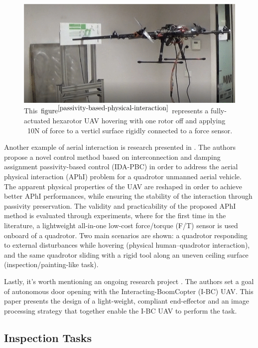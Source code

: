 \begin{figure}[H]
	\includegraphics[width=0.95\columnwidth]{figure/passivity-based-interaction.png}	
	\centering
	\caption{This $\text{figure}^{\cite{passivity-based-physical-interaction}}$ represents a fully-actuated hexarotor UAV hovering with one rotor off and applying ~10N of force to a verticl surface rigidly connected to a force sensor.}
	\label{fig:aerial_compliance}
\end{figure}

Another example of aerial interaction is research presented in \cite{passivity-based-aerial-interaction}. The authors propose a novel control method based on interconnection and damping assignment passivity-based control (IDA-PBC) in order to address the aerial physical interaction (APhI) problem for a quadrotor unmanned aerial vehicle. The apparent physical properties of the UAV are reshaped in order to achieve better APhI performances, while ensuring the stability of the interaction through passivity preservation. The validity and practicability of the proposed APhI method is evaluated through experiments, where for the first time in the literature, a lightweight all-in-one low-cost force/torque (F/T) sensor is used onboard of a quadrotor. Two main scenarios are shown: a quadrotor responding to external disturbances while hovering (physical human–quadrotor interaction), and the same quadrotor sliding with a rigid tool along an uneven ceiling surface (inspection/painting-like task).

Lastly, it's worth mentioning an ongoing research project \cite{door-opening}. The authors set a goal of autonomous door opening with the Interacting-BoomCopter (I-BC) UAV. This paper presents the design of a light-weight, compliant end-effector and an image processing strategy that together enable the I-BC UAV to perform the task. 

\subsection{Inspection Tasks}

